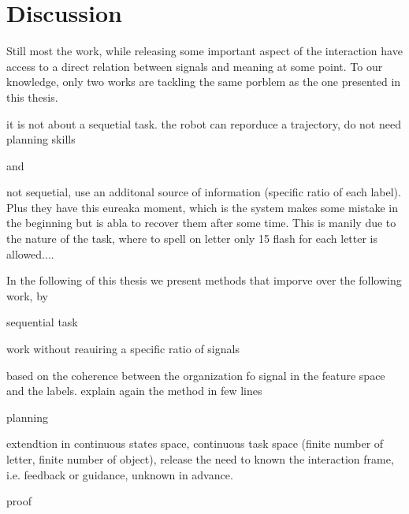 \section{Discussion}

Still most the work, while releasing some important aspect of the interaction have access to a direct relation between signals and meaning at some point. To our knowledge, only two works are tackling the same porblem as the one presented in this thesis.

 
\cite{cederborg2011imitating}
it is not about a sequetial task. the robot can reporduce a trajectory, do not need planning skills

and

\cite{Kindermans2012a,Kindermans2012b,kindermans2014integrating} not sequetial, use an additonal source of information (specific ratio of each label). Plus they have this eureaka moment, which is the system makes some mistake in the beginning but is abla to recover them after some time. This is manily due to the nature of the task, where to spell on letter only 15 flash for each letter is allowed....

In the following of this thesis we present methods that imporve over the following work, by

sequential task

work without reauiring a specific ratio of signals

based on the coherence between the organization fo signal in the feature space and the labels. explain again the method in few lines

planning

extendtion in continuous states space, continuous task space (finite number of letter, finite number of object), release the need to known the interaction frame, i.e. feedback or guidance, unknown in advance.

proof


